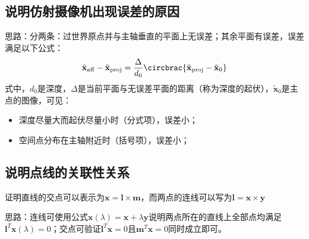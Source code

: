 \documentclass[11pt]{article}
\begin{document}
\subsection{  说明仿射摄像机出现误差的原因}
\par
思路：分两条：过世界原点并与主轴垂直的平面上无误差；其余平面有误差，误差满足以下公式：
\begin{equation*}
  \tilde{\mathbf{x}}_\mathrm{aff}-\tilde{\mathbf{x}}_\mathrm{proj}=\frac{\Delta}{d_0}\circbrac{\tilde{\mathbf{x}}_\mathrm{proj}-\tilde{\mathbf{x}}_\mathrm{0}}
\end{equation*}
式中，$d_0$是深度，$\Delta$是当前平面与无误差平面的距离（称为深度的起伏），$\tilde{\mathbf{x}}_0$是主点的图像，可见：
\begin{itemize}
  \item 深度尽量大而起伏尽量小时（分式项），误差小；
  \item 空间点分布在主轴附近时（括号项），误差小；
\end{itemize}
\subsection{说明点线的关联性关系}
{\heiti 证明直线的交点可以表示为$\mathbf{x=l\times m}$，而两点的连线可以写为$\mathbf{l=x\times y}$}\par
思路：连线可使用公式$\mathbf{x}(\lambda)=\mathbf{x}+\lambda\mathbf{y}$说明两点所在的直线上全部点均满足$\mathbf{l}^T\mathbf{x}(\lambda)=0$；交点可验证$\mathbf{l}^T\mathbf{x}=0$且$\mathbf{m}^T\mathbf{x}=0$同时成立即可。
\newpage
\printbibliography[heading=bibliography,title=参考文献]
\end{document}
